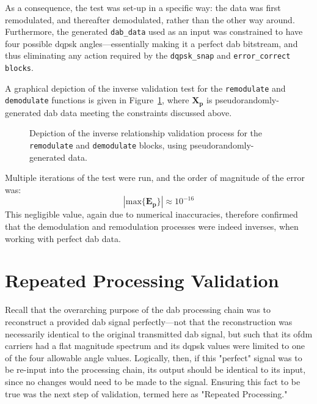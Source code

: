 \documentclass[class=report,11pt,crop=false]{standalone}
\begin{document}
As a consequence, the test was set-up in a specific way: the data was first remodulated, and thereafter demodulated, rather than the other way around. Furthermore, the generated \texttt{dab\_data} used as an input was constrained to have four possible \gls{dqpsk} angles---essentially making it a perfect \gls{dab} bitstream, and thus eliminating any action required by the \texttt{dqpsk\_snap} and \texttt{error\_correct blocks}.

A graphical depiction of the inverse validation test for the \texttt{remodulate} and \texttt{demodulate} functions is given in Figure~\ref{fig:inverse-remod-demod}, where \(\mathbf{X_p}\) is pseudorandomly-generated \gls{dab} data meeting the constraints discussed above.

\begin{figure}[htbp]
  \centering
  \captionsetup{type=figure}
  \def\svgwidth{\linewidth}
  { %
      }
  \caption{Depiction of the inverse relationship validation process for the \texttt{remodulate} and \texttt{demodulate} blocks, using pseudorandomly-generated  data.}
  \label{fig:inverse-remod-demod}
\end{figure}

Multiple iterations of the test were run, and the order of magnitude of the error was:
\begin{equation}
  \left| \mathrm{max} \{ \mathbf{E_p} \} \right| \approx 10^{-16}
\end{equation}
This negligible value, again due to numerical inaccuracies, therefore confirmed that the demodulation and remodulation processes were indeed inverses, when working with perfect \gls{dab} data.

\section{Repeated Processing Validation}
Recall that the overarching purpose of the \gls{dab} processing chain was to reconstruct a provided \gls{dab} signal perfectly---not that the reconstruction was necessarily identical to the original transmitted \gls{dab} signal, but such that its \gls{ofdm} carriers had a flat magnitude spectrum and its \gls{dqpsk} values were limited to one of the four allowable angle values. Logically, then, if this "perfect" signal was to be re-input into the processing chain, its output should be identical to its input, since no changes would need to be made to the signal. Ensuring this fact to be true was the next step of validation, termed here as "Repeated Processing."
\end{document}
